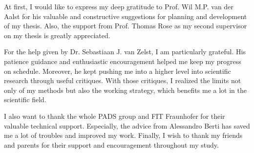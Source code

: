 At first, I would like to express my deep gratitude to Prof. Wil M.P. van der Aalst for his valuable and constructive suggestions for planning and development of my thesis. Also, the support from Prof. Thomas Rose as my second supervisor on my thesis is greatly appreciated.


For the help given by Dr. Sebastiaan J. van Zelst, I am particularly grateful. His patience guidance and enthusiastic encouragement helped me keep my progress on schedule. Moreover, he kept pushing me into a higher level into scientific research through useful critiques. With those critiques, I realized the limits not only of my methods but also the working strategy, which benefits me a lot in the scientific field.  

I also want to thank the whole PADS group and FIT Fraunhofer for their valuable technical support. Especially, the advice from Alessandro Berti has saved me a lot of troubles and improved my work. 
Finally, I wish to thank my friends and parents for their support and encouragement throughout my study.